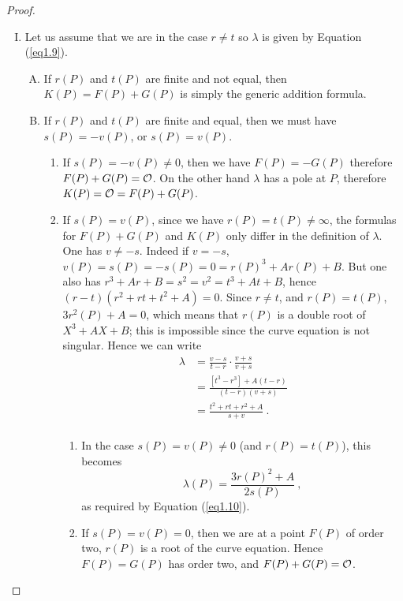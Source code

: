 \begin{proof}
\begin{enumerate}[(I)]
\item
Let us assume that we are in the case $r \neq t$ so $\lambda$ is given by Equation (\ref{eq1.9}).
\begin{enumerate}[(A)]
\item
If $r(P)$ and $t(P)$ are finite and not equal, then $K(P)=F(P)+G(P)$ is simply the generic addition formula.
\item
If $r(P)$ and $t(P)$ are finite and equal, then we must have $s(P)=-v(P)$, or $s(P)=v(P)$.
\begin{enumerate}[(1)]
\item
If $s(P)=-v(P)\neq 0$, then we have $F(P)=-G(P)$ therefore $F(P)+G(P)=\mathcal{O}$. On the other hand $\lambda$ has a pole at $P$, therefore $K(P)=\mathcal{O} = F(P)+G(P)$.
\item
If $s(P)=v(P)$, since we have $r(P)=t(P)\neq \infty$, the formulas for $F(P)+G(P)$ and $K(P)$ only differ in the definition of $\lambda$. One has $v\neq-s$. Indeed if $v=-s$, $v(P)=s(P)=-s(P)=0 = r(P)^3+Ar(P)+B$. But one also has $r^3+Ar+B=s^2 = v^2 = t^3+At+B$, hence $(r-t)(r^2 + rt+t^2 + A)=0$. Since $r \neq t$, and $r(P)=t(P)$, $3r^2(P)+A=0$, which means that $r(P)$ is a double root of $X^3+AX+B$;  this is impossible since the curve equation is not singular. Hence we can write
\begin{align*}
\lambda&=\frac{v-s}{t-r}\cdot\frac{v+s}{v+s}\\
&=\frac{[t^{3}-r^{3}]+A(t-r)}{(t-r)(v+s)}\\
&=\frac{t^{2}+rt+r^{2}+A}{s+v}\ .\\
\end{align*}
\begin{enumerate}
\item
In the case $s(P)=v(P)\neq 0$ (and $r(P)=t(P)$), this becomes
$$
\lambda(P)=\frac{3r(P)^{2}+A}{2s(P)}\ ,
$$
as required by Equation (\ref{eq1.10}).
\item
If $s(P)=v(P)=0$, then we are at a point $F(P)$ of order two, {\ie} $r(P)$ is a root of the curve equation. Hence $F(P)=G(P)$ has order two, and 
$F(P)+G(P)=\mathcal{O}$.


\end{enumerate}
\end{enumerate}
\end{enumerate}
\end{enumerate}
\end{proof}
